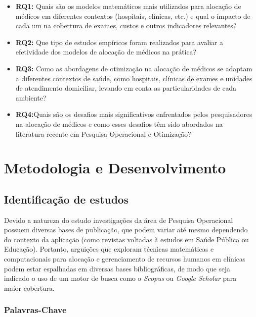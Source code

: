 \documentclass[article,12pt,oneside]{article}
\begin{document}
	\begin{itemize}
		\item \textbf{RQ1:} Quais são os modelos matemáticos mais utilizados para alocação de médicos em diferentes contextos (hospitais, clínicas, etc.) e qual o impacto de cada um na cobertura de exames, custos e outros indicadores relevantes?
		\item \textbf{RQ2:} Que tipo de estudos empíricos foram realizados para avaliar a efetividade dos modelos de alocação de médicos na prática?
		\item \textbf{RQ3:} Como as abordagens de otimização na alocação de médicos se adaptam a diferentes contextos de saúde, como hospitais, clínicas de exames e unidades de atendimento domiciliar, levando em conta as particularidades de cada ambiente?
		\item \textbf{RQ4:}Quais são os desafios mais significativos enfrentados pelos pesquisadores na alocação de médicos e como esses desafios têm sido abordados na literatura recente em Pesquisa Operacional e Otimização?
	\end{itemize}

\section*{Metodologia e Desenvolvimento}

\subsection*{Identificação de estudos}

Devido a natureza do estudo investigações da área de Pesquisa Operacional possuem diversas bases de publicação, que podem variar até mesmo dependendo do contexto da aplicação (como revistas voltadas à estudos em Saúde Pública ou Educação). Portanto, arguições que exploram técnicas matemáticas e computacionais para alocação e gerenciamento de recursos humanos em clínicas podem estar espalhadas em diversas bases bibliográficas, de modo que seja indicado o uso de um motor de busca como o \textit{Scopus} ou \textit{Google Scholar} para maior cobertura.

\subsubsection*{Palavras-Chave}
\end{document}

